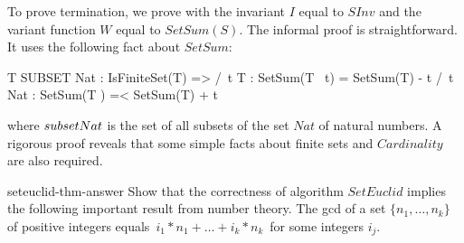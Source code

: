 To prove termination, we prove
with the invariant $I$ equal to $SInv$ and the variant function
$W$ equal to $SetSum(S)$.  The informal proof is straightforward.
It uses the following fact about $SetSum$:
\begin{display}
\begin{notla}
\A T \in SUBSET Nat : 
    IsFiniteSet(T) => /\ \A t \in T : SetSum(T \ {t}) = SetSum(T) - t 
                      /\ \A t \in Nat : SetSum(T ) =< SetSum(T) + t 
\end{notla}
\begin{tlatex}
%
\end{tlatex}
\end{display}
where 
$\SUBSET Nat$ is the set of all subsets of the set $Nat$ of natural
numbers.  A rigorous proof reveals that some simple facts about finite
sets and $Cardinality$ are also required.

\begin{aquestion}{seteuclid-thm-answer} 
Show that the correctness of algorithm $SetEuclid$ implies the
following important result from number theory.  The gcd of a set
$\{n_{1}, \ldots, n_{k}\}$ of positive integers equals
 $\, i_{1}*n_{1} + \ldots + i_{k}*n_{k} \,$
for some integers $i_{j}$.
\end{aquestion}

\bigskip
\noindent
{}